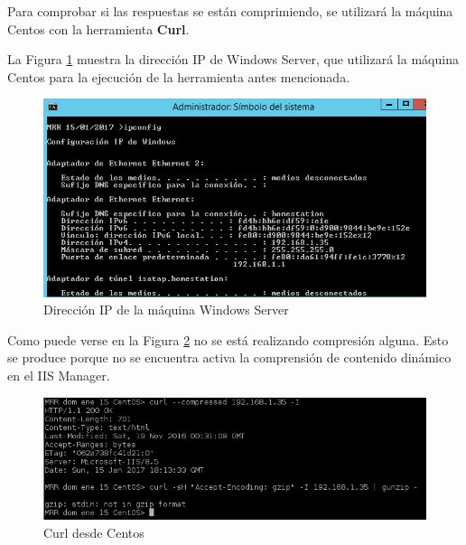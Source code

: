 Para comprobar si las respuestas se están comprimiendo, se utilizará la máquina Centos con la herramienta \textbf{Curl}\cite{enlace10}.

La Figura \ref{fig:figura5-2} muestra la dirección IP de Windows Server, que utilizará la máquina Centos para la ejecución de la herramienta antes mencionada.
	\begin{figure}[H] %
		\centering
		\includegraphics[scale=0.6]{figuras/ejercicio5/figura5-2.png} 
		\caption{Dirección IP de la máquina Windows Server} 
		\label{fig:figura5-2}
	\end{figure}

Como puede verse en la Figura \ref{fig:figura5-3} no se está realizando compresión alguna. Esto se produce porque no se encuentra activa la comprensión de contenido dinámico en el IIS Manager.
	\begin{figure}[H] %
		\centering
		\includegraphics[scale=0.8]{figuras/ejercicio5/figura5-3.png} 
		\caption{Curl desde Centos} 
		\label{fig:figura5-3}
	\end{figure}


